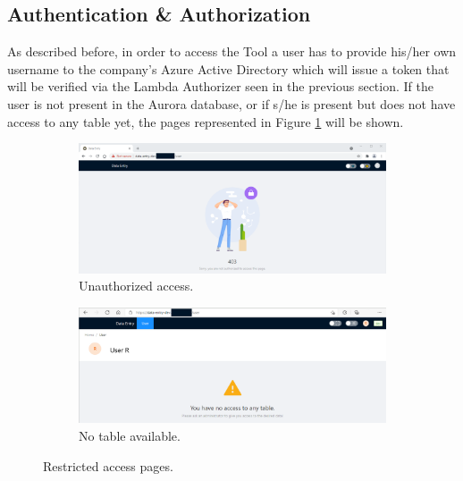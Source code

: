 




\subsection*{Authentication \& Authorization}
As described before, in order to access the Tool a user has to provide his/her own username to the company's Azure Active Directory which will issue a token that will be verified via the Lambda Authorizer seen in the previous section. If the user is not present in the Aurora database, or if s/he is present but does not have access to any table yet, the pages represented in Figure \ref{fig:403Empty} will be shown.


\begin{figure}[!htb]
  \begin{subfigure}{\linewidth}
    \centering
    \includegraphics[width=15.8cm]{chapters/images/ch_3/FE/403.png}
    \caption{Unauthorized access.}
  \end{subfigure}\par\medskip
  \begin{subfigure}{\linewidth}
    \centering
    \includegraphics[width=15.8cm]{chapters/images/ch_3/FE/empty.png}
    \caption{No table available.}
  \end{subfigure}\par\medskip
  \caption{Restricted access pages.}
  \label{fig:403Empty}
\end{figure}
 

